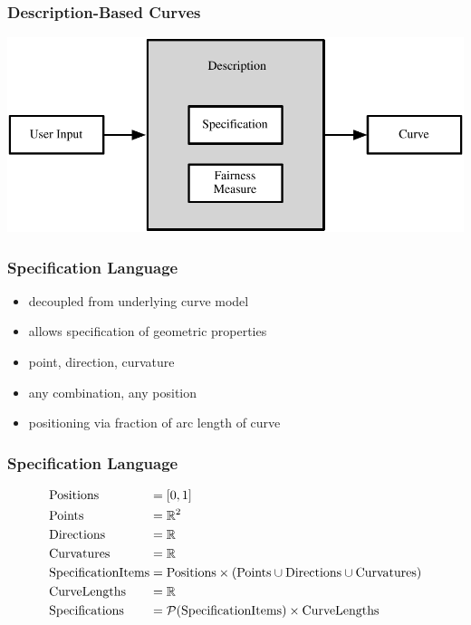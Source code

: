 \documentclass{beamer}
\begin{document}
		\begin{frame}
			\frametitle{Description-Based Curves}
			\begin{centering}
				\includegraphics[width=\textwidth]{../resources/description-based_curves.pdf}\\
			\end{centering}
		\end{frame}
		
		\begin{frame}
			\frametitle{Specification Language}
			\begin{itemize}
				\item decoupled from underlying curve model
				\item allows specification of geometric properties
				\item point, direction, curvature
				\item any combination, any position
				\item positioning via fraction of arc length of curve
			\end{itemize}
		\end{frame}

		\begin{frame}
			\frametitle{Specification Language}
			\begin{equation*}
				\begin{alignedat}{2}
					& \mathrm{Positions}          && = \left[ 0,1 \right]\\
					& \mathrm{Points}             && = \mathbb{R}^{2}\\
					& \mathrm{Directions}         && = \mathbb{R}\\
					& \mathrm{Curvatures}         && = \mathbb{R}\\
					& \mathrm{SpecificationItems} && = \mathrm{Positions} \times \left(\mathrm{Points} \cup \mathrm{Directions} \cup \mathrm{Curvatures}\right)\\
					& \mathrm{CurveLengths}       && = \mathbb{R}\\
					& \mathrm{Specifications}     && = \mathcal{P}\!\left( \mathrm{SpecificationItems} \right) \times \mathrm{CurveLengths}
				\end{alignedat}
			\end{equation*}
		\end{frame}
		
\end{document}
